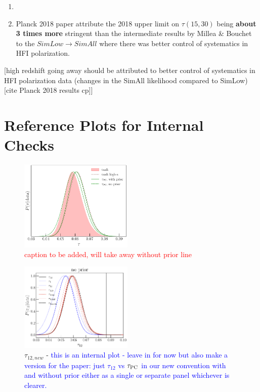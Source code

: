 \documentclass[prd,twocolumn,amsmath,amssymb,floatfix,superscriptaddress,nofootinbib]{revtex4-1}
\newcommand{\wh}[1]{\textcolor{blue}{#1}}
\newcommand{\ch}[1]{\textcolor{red}{#1}}
\begin{document}
{\begin{enumerate}
    \item 
    \item {Planck 2018 paper attribute the 2018 upper limit on $\tau(15, 30)$ being \textbf{about 3 times more} stringent than the intermediate results by Millea \& Bouchet to the $SimLow \rightarrow SimAll$ where there was better control of systematics in HFI polarization.}
\end{enumerate}


[high redshift going away should be attributed to better control of systematics in HFI polarization data (changes in the SimAll likelihood compared to SimLow) [cite Planck 2018 results cp]]

\section{Reference Plots for Internal Checks}

\begin{figure}
\includegraphics[width=0.48\textwidth]{results/tau_posterior_comparisons/pl18_tau_posterior_tanh_vs_tanh_highz_vs_pc_dz_auto_zre_prior_6p1_normalized_by_max.pdf}
\caption{\ch{caption to be added, will take away without prior line}}
\label{fig:tau_posterior_PC_vs_tanh_vs_tanh_highz}
\end{figure}

\begin{figure}[ht]
\includegraphics[width=0.48\textwidth]{results/tau_pc_decomposition/plot_taumj_decomposition_apply_cut_False_pl18_pc_zmax30_pliklite_srollv2_1015.pdf}
\caption{$\tau_{12,new}$ - \wh{this is an internal plot - leave in for now but also make a version for the paper: just $\tau_{12}$ vs $\tau_{\rm PC}$ in our new convention with and without prior either as a single or separate panel whichever is clearer.}}
\end{figure}

}
\end{document}
